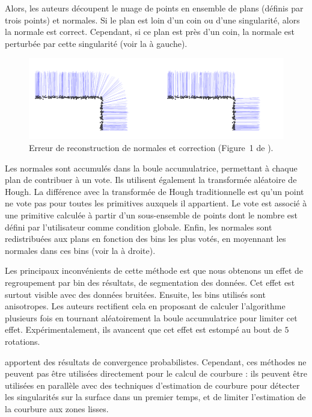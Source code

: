 Alors, les auteurs découpent le nuage de points en ensemble de plans (définis
par trois points) et normales. Si le plan est loin d'un coin ou d'une
singularité, alors la normale est correct. Cependant, si ce plan est près d'un
coin, la normale est perturbée par cette singularité (voir la
 à gauche).

\begin{figure}[ht]{
    \begin{center}
    \includegraphics[width=15cm]{images/Curvature/Hough_bad}
    \end{center}}
    \caption[Erreur de reconstruction de normales et correction.]{Erreur de reconstruction de normales et correction (Figure~1 de \cite{Boulch2012}). \label{fig:Hough-bad}}
\end{figure}

Les normales sont accumulés dans la boule accumulatrice, permettant à chaque
plan de contribuer à un vote. Ils utilisent également la transformée aléatoire
de Hough. La différence avec la transformée de Hough traditionnelle est qu'un
point ne vote pas pour toutes les primitives auxquels il appartient. Le vote est
associé à une primitive calculée à partir d'un sous-ensemble de points
\cite{Xu1990, Xu1993} dont le nombre est défini par l'utilisateur comme
condition globale. Enfin, les normales sont redistribuées aux plans en fonction
des bins les plus votés, en moyennant les normales dans ces bins (voir la
 à droite).


Les principaux inconvénients de cette méthode est que nous obtenons un effet de
regroupement par bin des résultats, de segmentation des données. Cet effet est
surtout visible avec des données bruitées. Ensuite, les bins utilisés sont
anisotropes. Les auteurs rectifient cela en proposant de calculer l’algorithme
plusieurs fois en tournant aléatoirement la boule accumulatrice pour limiter cet
effet. Expérimentalement, ils avancent que cet effet est estompé au bout de $5$
rotations.


 apportent des résultats de convergence probabilistes.
Cependant, ces méthodes ne peuvent pas être utilisées directement pour le calcul
de courbure : ils peuvent être utilisées en parallèle avec des techniques
d'estimation de courbure pour détecter les singularités sur la surface dans un
premier temps, et de limiter l'estimation de la courbure aux zones lisses.
%
